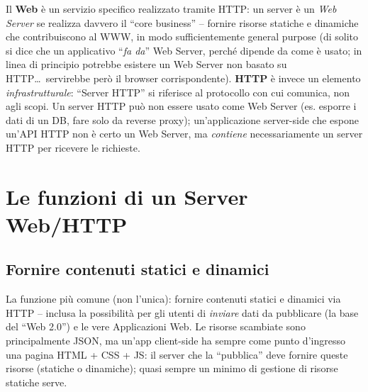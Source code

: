 \begin{importante}
Il \textbf{Web} \`e un servizio specifico realizzato tramite HTTP: un server \`e un
\emph{Web Server} se realizza davvero il ``core business'' -- fornire risorse statiche e
dinamiche che contribuiscono al WWW, in modo sufficientemente general purpose (di solito si
dice che un applicativo ``\emph{fa da}'' Web Server, perch\'e dipende da come \`e usato; in
linea di principio potrebbe esistere un Web Server non basato su HTTP\dots\ servirebbe
per\`o il browser corrispondente).
\textbf{HTTP} \`e invece un elemento \emph{infrastrutturale}: ``Server HTTP'' si riferisce al
protocollo con cui comunica, non agli scopi. Un server HTTP pu\`o non essere usato come Web
Server (es. esporre i dati di un DB, fare solo da reverse proxy); un'applicazione server-side
che espone un'API HTTP non \`e certo un Web Server, ma \emph{contiene} necessariamente un
server HTTP per ricevere le richieste.
\end{importante}

\section{Le funzioni di un Server Web/HTTP}

\subsection{Fornire contenuti statici e dinamici}
La funzione pi\`u comune (non l'unica): fornire contenuti statici e dinamici via HTTP --
inclusa la possibilit\`a per gli utenti di \emph{inviare} dati da pubblicare (la base del
``Web 2.0'') e le vere Applicazioni Web. Le risorse scambiate sono principalmente JSON, ma
un'app client-side ha sempre come punto d'ingresso una pagina HTML + CSS + JS: il server che
la ``pubblica'' deve fornire queste risorse (statiche o dinamiche); quasi sempre un minimo di
gestione di risorse statiche serve.

